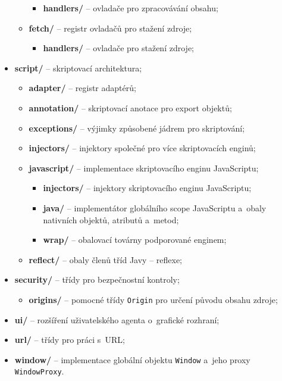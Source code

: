 \begin{itemize}
\begin{itemize}
         \begin{itemize}
           \item[] \textbf{handlers/} -- ovladače pro zpracovávání obsahu;
         \end{itemize}
       \item[] \textbf{fetch/} -- registr ovladačů pro stažení zdroje;
         \begin{itemize}
           \item[] \textbf{handlers/} -- ovladače pro stažení zdroje;
         \end{itemize}
     \end{itemize}
  \item \textbf{script/} -- skriptovací architektura;
     \begin{itemize}
       \item[] \textbf{adapter/} -- registr adaptérů;
       \item[] \textbf{annotation/} -- skriptovací anotace pro export objektů;
       \item[] \textbf{exceptions/} -- výjimky způsobené jádrem pro skriptování;
       \item[] \textbf{injectors/} -- injektory společné pro více skriptovacích enginů;
       \item[] \textbf{javascript/} -- implementace skriptovacího enginu JavaScriptu;
         \begin{itemize}
           \item[] \textbf{injectors/} -- injektory skriptovacího enginu JavaScriptu;
           \item[] \textbf{java/} -- implementátor globálního scope JavaScriptu a~obaly nativních objektů, atributů a~metod;
           \item[] \textbf{wrap/} -- obalovací továrny podporované enginem;
         \end{itemize}
       \item[] \textbf{reflect/} -- obaly členů tříd Javy -- reflexe;
     \end{itemize}
  \item \textbf{security/} -- třídy pro bezpečnostní kontroly;
     \begin{itemize}
       \item[] \textbf{origins/} -- pomocné třídy \texttt{Origin} pro určení původu obsahu zdroje;
     \end{itemize}
  \item \textbf{ui/} -- rozšíření uživatelského agenta o~grafické rozhraní;
  \item \textbf{url/} -- třídy pro práci s~URL;
  \item \textbf{window/} -- implementace globální objektu \texttt{Window} a~jeho proxy \texttt{WindowProxy}.
\end{itemize} 



